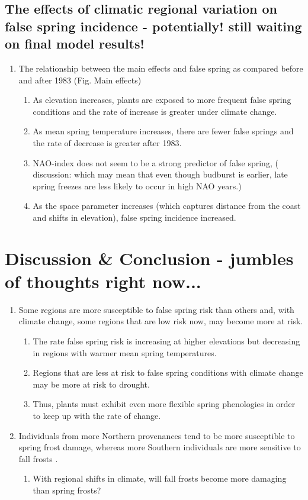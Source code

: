 \documentclass{article}\usepackage[]{graphicx}\usepackage[]{color}
\begin{document}
\subsection*{The effects of climatic regional variation on false spring incidence - potentially! still waiting on final model results!}
\begin{enumerate}
\item The relationship between the main effects and false spring as compared before and after 1983 (Fig. Main effects)
\begin{enumerate}
\item As elevation increases, plants are exposed to more frequent false spring conditions and the rate of increase is greater under climate change.
\item As mean spring temperature increases, there are fewer false springs and the rate of decrease is greater after 1983.
\item NAO-index does not seem to be a strong predictor of false spring, ( discussion: which may mean that even though budburst is earlier, late spring freezes are less likely to occur in high NAO years.)
\item As the space parameter increases (which captures distance from the coast and shifts in elevation), false spring incidence increased. 
\end{enumerate}
\end{enumerate}

\section*{Discussion \& Conclusion - jumbles of thoughts right now...}
\begin{enumerate}
\item Some regions are more susceptible to false spring risk than others and, with climate change, some regions that are low risk now, may become more at risk.
\begin{enumerate}
\item The rate false spring risk is increasing at higher elevations but decreasing in regions with warmer mean spring temperatures. 
\item Regions that are less at risk to false spring conditions with climate change may be more at risk to drought. 
\item Thus, plants must exhibit even more flexible spring phenologies in order to keep up with the rate of change. 
\end{enumerate}
\item Individuals from more Northern provenances tend to be more susceptible to spring frost damage, whereas more Southern individuals are more sensitive to fall frosts \citep{Montwe2018}.
\begin{enumerate}
\item With regional shifts in climate, will fall frosts become more damaging than spring frosts?
\end{enumerate}
\end{enumerate}
\end{document}
